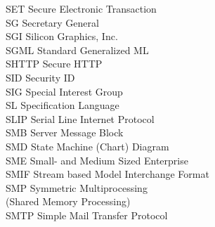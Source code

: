 \begin{tabbing}
    \>SET \>\>Secure Electronic Transaction\\

    \>SG \>\>Secretary General\\


    \>SGI \>\>Silicon Graphics, Inc.\\

    \>SGML \>\>Standard Generalized ML\\

    \>SHTTP \>\>Secure HTTP\\

    \>SID \>\>Security ID\\


    \>SIG \>\>Special Interest Group\\



    \>SL \>\>Specification Language\\

    \>SLIP \>\>Serial Line Internet Protocol\\


    \>SMB \>\>Server Message Block\\

    \>SMD \>\>State Machine (Chart) Diagram\\

    \>SME \>\>Small- and Medium Sized Enterprise\\

    \>SMIF \>\>Stream based Model Interchange Format\\


    \>SMP \>\>Symmetric Multiprocessing\\
        \>\>\>(Shared Memory Processing)\\

    \>SMTP \>\>Simple Mail Transfer Protocol\\



\end{tabbing}
